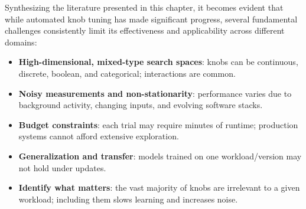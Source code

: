 Synthesizing the literature presented in this chapter, it becomes evident that while automated knob tuning has made significant progress, several fundamental challenges consistently limit its effectiveness and applicability across different domains:
\begin{itemize}
    \item \textbf{High-dimensional, mixed-type search spaces}: knobs can be continuous, discrete, boolean, and categorical; interactions are common.
    \item \textbf{Noisy measurements and non-stationarity}: performance varies due to background activity, changing inputs, and evolving software stacks.
    \item \textbf{Budget constraints}: each trial may require minutes of runtime; production systems cannot afford extensive exploration.
    \item \textbf{Generalization and transfer}: models trained on one workload/version may not hold under updates.
    \item \textbf{Identify what matters}: the vast majority of knobs are irrelevant to a given workload; including them slows learning and increases noise.
\end{itemize}

